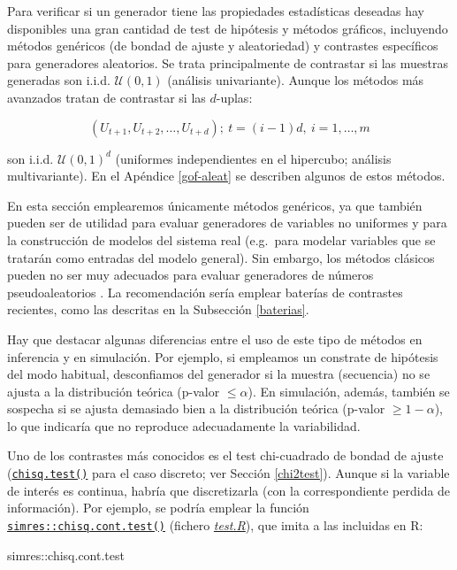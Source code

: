 \documentclass[
  10pt,
]{book}
\newenvironment{Shaded}{\begin{snugshade}}{\end{snugshade}}
\newcommand{\NormalTok}[1]{#1}
\newcommand{\SpecialCharTok}[1]{\textcolor[rgb]{0.00,0.00,0.00}{#1}}
\theoremstyle{break}
\theoremstyle{nonumberplain}
\begin{document}
Para verificar si un generador tiene las propiedades estadísticas deseadas hay disponibles una gran cantidad de test de hipótesis y métodos gráficos,
incluyendo métodos genéricos (de bondad de ajuste y aleatoriedad) y contrastes específicos para generadores aleatorios.
Se trata principalmente de contrastar si las muestras generadas son i.i.d. \(\mathcal{U}\left(0,1\right)\) (análisis univariante).
Aunque los métodos más avanzados tratan de contrastar si las \(d\)-uplas:

\[(U_{t+1},U_{t+2},\ldots,U_{t+d}); \ t=(i-1)d, \ i=1,\ldots,m\]

son i.i.d. \(\mathcal{U}\left(0,1\right)^{d}\) (uniformes independientes en el hipercubo; análisis multivariante).
En el Apéndice \ref{gof-aleat} se describen algunos de estos métodos.

En esta sección emplearemos únicamente métodos genéricos, ya que también pueden ser de utilidad para evaluar generadores de variables no uniformes y para la construcción de modelos del sistema real (e.g.~para modelar variables que se tratarán como entradas del modelo general).
Sin embargo, los métodos clásicos pueden no ser muy adecuados para evaluar generadores de números pseudoaleatorios \citep[ver][]{lecuyer07}.
La recomendación sería emplear baterías de contrastes recientes, como las descritas en la Subsección \ref{baterias}.

Hay que destacar algunas diferencias entre el uso de este tipo de métodos en inferencia y en simulación.
Por ejemplo, si empleamos un constrate de hipótesis del modo habitual, desconfiamos del generador si la muestra (secuencia) no se ajusta a la distribución teórica (p-valor \(\leq \alpha\)).
En simulación, además, también se sospecha si se ajusta demasiado bien a la distribución teórica (p-valor \(\geq1-\alpha\)), lo que indicaría que no reproduce adecuadamente la variabilidad.

Uno de los contrastes más conocidos es el test chi-cuadrado de bondad de ajuste (\href{https://rdrr.io/r/stats/chisq.test.html}{\texttt{chisq.test()}} para el caso discreto; ver Sección \ref{chi2test}).
Aunque si la variable de interés es continua, habría que discretizarla (con la correspondiente perdida de información).
Por ejemplo, se podría emplear la función \href{https://rubenfcasal.github.io/simres/reference/chisq.cont.test.html}{\texttt{simres::chisq.cont.test()}} (fichero \href{R/test.R}{\emph{test.R}}), que imita a las incluidas en R:

\begin{Shaded}
\begin{Highlighting}[]
\NormalTok{simres}\SpecialCharTok{::}\NormalTok{chisq.cont.test}
\end{Highlighting}
\end{Shaded}
\end{document}
